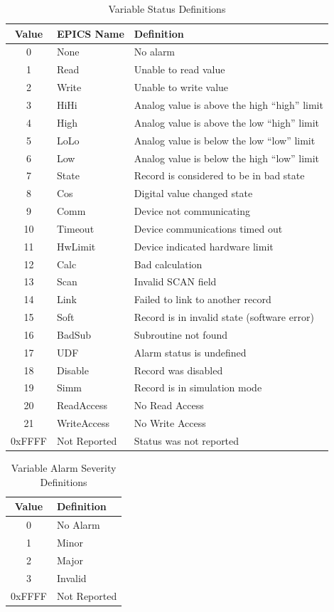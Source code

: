 \begin{table}[h]
  \begin{center}
    \begin{tabular}{c | l | l}
	Value & EPICS Name & Definition \\
	\hline
	0 & None & No alarm \\
	1 & Read & Unable to read value \\
	2 & Write & Unable to write value \\
	3 & HiHi & Analog value is above the high ``high'' limit \\
	4 & High & Analog value is above the low ``high'' limit \\
	5 & LoLo & Analog value is below the low ``low'' limit \\
	6 & Low & Analog value is below the high ``low'' limit \\
	7 & State & Record is considered to be in bad state \\
	8 & Cos & Digital value changed state \\
	9 & Comm & Device not communicating \\
	10 & Timeout & Device communications timed out \\
	11 & HwLimit & Device indicated hardware limit \\
	12 & Calc & Bad calculation \\
	13 & Scan & Invalid SCAN field \\
	14 & Link & Failed to link to another record \\
	15 & Soft & Record is in invalid state (software error) \\
	16 & BadSub & Subroutine not found \\
	17 & UDF & Alarm status is undefined \\
	18 & Disable & Record was disabled \\
	19 & Simm & Record is in simulation mode \\
	20 & ReadAccess & No Read Access \\
	21 & WriteAccess & No Write Access \\
	0xFFFF & Not Reported & Status was not reported \\
    \end{tabular}
  \end{center}
  \caption {Variable Status Definitions}
  \label{table:protocol_variable_status_values}
\end{table}

\begin{table}[h]
  \begin{center}
    \begin{tabular}{c | l}
	Value & Definition \\
	\hline
	0 & No Alarm \\
	1 & Minor \\
	2 & Major \\
	3 & Invalid \\
	0xFFFF & Not Reported \\
    \end{tabular}
  \end{center}
  \caption {Variable Alarm Severity Definitions}
  \label{table:protocol_variable_severity_values}
\end{table}


